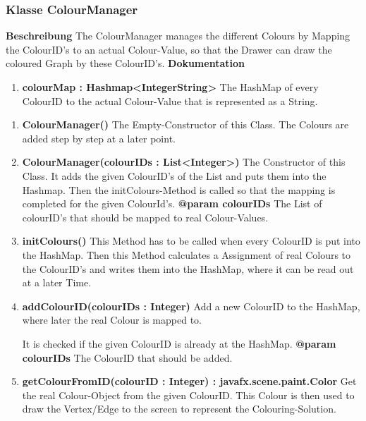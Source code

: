\documentclass{article}
\newcommand{\myclass}[1]{\subsubsection*{Klasse #1} \label{#1} \addcontentsline{toc}{subsubsection}{\nameref{#1}}}
\begin{document}
\begin{enumerate}
{			\myclass{ColourManager}
				\textbf{Beschreibung}
				The ColourManager manages the different Colours by Mapping the ColourID's to an actual Colour-Value, so that the Drawer can draw the coloured Graph by these ColourID's.
				\textbf{Dokumentation}
				\begin{enumerate}[-]
					\item{
						\textbf{colourMap : Hashmap<IntegerString>} \newline
						The HashMap of every ColourID to the actual Colour-Value that is represented as a String.
					}
				\end{enumerate}
				\begin{enumerate}[+]
					\item{
						\textbf{ColourManager()} \newline
						The Empty-Constructor of this Class.
						The Colours are added step by step at a later point.
						\newline
					}
					\item{
						\textbf{ColourManager(colourIDs : List<Integer>)} \newline
						The Constructor of this Class.
						It adds the given ColourID's of the List and puts them into the Hashmap.
						Then the initColours-Method is called so that the mapping is completed for the given ColourId's.
						\newline
						\textbf{@param colourIDs}
							The List of colourID's that should be mapped to real Colour-Values.
							\newline
					}
					\item{
						\textbf{initColours()} \newline
						This Method has to be called when every ColourID is put into the HashMap.
						Then this Method calculates a Assignment of real Colours to the ColourID's and writes them into the HashMap, where it can be read out at a later Time.
						\newline
					}
					\item{
						\textbf{addColourID(colourIDs : Integer)} \newline
						Add a new ColourID to the HashMap, where later the real Colour is mapped to.
						
						It is checked if the given ColourID is already at the HashMap.
						\newline
						\textbf{@param colourIDs}
							The ColourID that should be added.
							\newline
					}
					\item{
						\textbf{getColourFromID(colourID : Integer) : javafx.scene.paint.Color} \newline
						Get the real Colour-Object from the given ColourID.
						This Colour is then used to draw the Vertex/Edge to the screen to represent the Colouring-Solution.
						
}
\end{enumerate}}
\end{enumerate}
\end{document}
